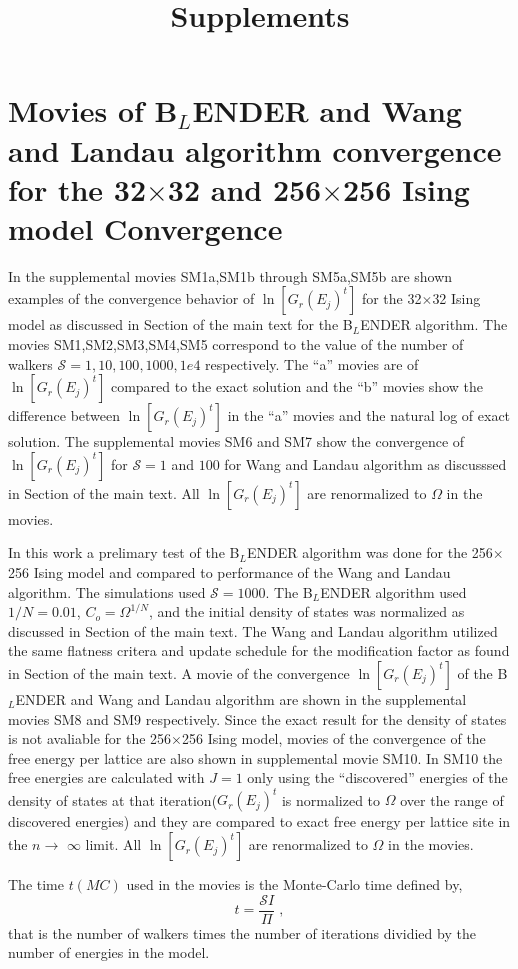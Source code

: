 \documentclass[a4paper,12pt]{article}
\title{Supplements}
\begin{document}
\newcommand{\RNum}[1]{\uppercase\expandafter{\romannumeral #1\relax}}
\section{Movies of B$_L$ENDER and Wang and Landau algorithm convergence for the 32$\times$32 and 256$\times$256 Ising model Convergence}
In the supplemental movies  SM1a,SM1b through SM5a,SM5b are shown examples of the convergence behavior of $\ln[G_r(E_j)^t]$ for the 32$\times$32 Ising model as discussed in Section \RNum{2} of the main text for the B$_L$ENDER algorithm. The movies SM1,SM2,SM3,SM4,SM5 correspond to the value of the number of walkers $\mathcal{S}=1,10,100,1000,1e4$ respectively. The ``a'' movies are of $\ln[G_r(E_j)^t]$  compared to the exact solution and the ``b'' movies show the difference between $\ln[G_r(E_j)^t]$  in the ``a'' movies and the natural log of exact solution. The supplemental movies SM6 and SM7 show the convergence of $\ln[G_r(E_j)^t]$  for $\mathcal{S}=1$ and $100$ for Wang and Landau algorithm as discusssed in Section \RNum{3} of the main text. All $\ln[G_r(E_j)^t]$ are renormalized to $\Omega$ in the movies. 

 In this work a prelimary test of the B$_L$ENDER algorithm was done for the 256$\times$256 Ising model and compared to performance of the Wang and Landau algorithm. The simulations used $\mathcal{S}=1000$. The B$_L$ENDER algorithm used $1/N=0.01$, $C_o = \Omega^{1/N}$, and the initial density of states was normalized as discussed in Section \RNum{2} of the main text. The Wang and Landau algorithm utilized the same flatness critera and update schedule for the modification factor as found in Section \RNum{3} of the main text. A movie of the convergence $\ln[G_r(E_j)^t]$ of the B$_L$ENDER and Wang and Landau algorithm  are shown in the supplemental movies SM8 and SM9 respectively.  Since the exact result for the density of states is not avaliable for the 256$\times$256 Ising model, movies of the convergence of the free energy per lattice are also shown in supplemental movie SM10. In SM10 the free energies are  calculated with $J=1$ only using the ``discovered'' energies of the density of states at that iteration($G_r(E_j)^t$ is normalized to $\Omega$ over the range of discovered energies) and they are compared to exact free energy per lattice site in the $n\rightarrow$ $\infty$ limit\cite{exact_statistical}. All $\ln[G_r(E_j)^t]$ are renormalized to $\Omega$ in the movies.
 
 The time $t(MC)$ used in the movies is the Monte-Carlo time defined by, 
\begin{equation}
t = \frac{\mathcal{S}I}{\Pi}\;,
\end{equation}
that is the number of walkers times the number of iterations dividied by the number of energies in the model. 
\end{document}
